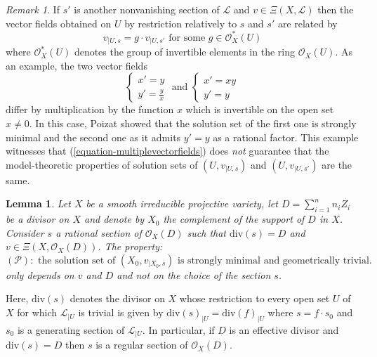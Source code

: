 \documentclass[12pt]{amsart}
\theoremstyle{definition}
\theoremstyle{plain}
\newtheorem{lemma}[definition]{Lemma}
\theoremstyle{exampstyle}
\theoremstyle{exampstyle}\newtheorem{thmxbis}{Theorem}
\numberwithin{equation}{section}
\theoremstyle{remark}
\newtheorem{remark}[definition]{Remark}
\begin{document}
\begin{remark} \label{remark-counterexample}
If $s'$ is another nonvanishing section of $\mathcal L$ and $v \in \Xi(X,\mathcal L)$ then the vector fields obtained on $U$ by restriction relatively to $s$ and $s'$ are related by  
\begin{equation}\label{equation-multiplevectorfields} v_{\mid U,s} = g \cdot v_{\mid U,s'} \text{ for some } g \in \mathcal O^{\ast}_X(U)
\end{equation}
where $\mathcal O^\ast_X(U)$ denotes the group of invertible elements in the ring $\mathcal O_X(U)$. As an example, the two vector fields 
$$ \begin{cases} 
x' = y \\
y' = \frac y x \end{cases} \text{ and } \begin{cases} x' = xy \\
y' = y \end{cases} $$
differ by multiplication by the function $x$ which is invertible on the open set $x \neq 0$. In this case, Poizat \cite{Poizat} showed that the solution set of the first one is strongly minimal and the second one as it admits $y' = y$ as a rational factor. This example witnesses that (\ref{equation-multiplevectorfields}) does {\em not} guarantee that the model-theoretic properties of solution sets of  $(U,v_{\mid U,s})$  and $(U, v_{\mid U,s'})$ are the same. 
\end{remark} 



\begin{lemma} \label{lemma-canonical-isomorphism}
Let $X$ be a smooth irreducible projective variety, let $D = \sum_{i = 1}^n n_i Z_i$ be a divisor on $X$ and denote by $X_0$  the complement of the support of $D$ in $X$. Consider $s$ a rational section of $\mathcal O_X(D)$ such that $\mathrm{div}(s) = D$ and $v \in \Xi(X, \mathcal O_X(D))$. The property:
$$(\mathcal P): \text{ the solution set of }(X_0,v_{\mid X_0,s}) \text{ is strongly minimal and geometrically trivial.} $$
only depends on $v$ and $D$ and not on the choice of the section $s$.  
\end{lemma}
Here, $\mathrm{div}(s)$ denotes the divisor on $X$ whose restriction to every open set $U$ of $X$ for which $\mathcal L_{\mid U}$ is trivial is given by $\mathrm{div}(s)_{\mid U} = \mathrm{div}(f)_{\mid U}$ where $s = f\cdot s_0$  and $s_0$ is a generating section of $\mathcal L_{\mid U}$. In particular, if $D$ is an effective divisor and $\mathrm{div}(s) = D$ then $s$ is a regular section of $\mathcal O_X(D)$.
\end{document}
